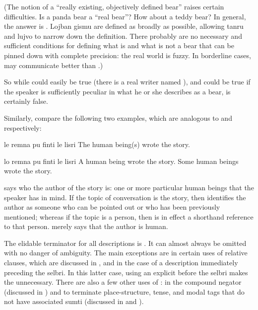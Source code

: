 (The notion of a ``really existing, objectively defined
    bear'' raises certain difficulties. Is a panda bear a ``real
    bear''? How about a teddy bear? In general, the answer is
    . Lojban gismu are defined as broadly as possible,
    allowing tanru and lujvo to narrow down the definition. There
    probably are no necessary and sufficient conditions for
    defining what is and what is not a bear that can be pinned down
    with complete precision: the real world is fuzzy. In borderline
    cases,  may communicate better than .)

So while  could easily be
    true (there is a real writer named ), and  could be true if the speaker is
    sufficiently peculiar in what he or she describes as a bear,  is certainly false.

Similarly, compare the following two examples, which are
    analogous to  and  respectively:
\begin{example}
le remna pu finti le lisri\n
The human being(s) wrote the story.
\end{example}

\begin{example}
lo remna pu finti le lisri\n
A human being wrote the story.\n
Some human beings wrote the story.
\end{example}

 says who the author of the
    story is: one or more particular human beings that the speaker
    has in mind. If the topic of conversation is the story, then  identifies the author as someone
    who can be pointed out or who has been previously mentioned;
    whereas if the topic is a person, then  is in
    effect a shorthand reference to that person.  merely says that the author is
    human. 

The elidable terminator for all descriptions is . It
    can almost always be omitted with no danger of ambiguity. The
    main exceptions are in certain uses of relative clauses, which
    are discussed in , and in the
    case of a description immediately preceding the selbri. In this
    latter case, using an explicit  before the selbri makes
    the  unnecessary. There are also a few other uses of
    : in the compound negator  (discussed in ) and to terminate
    place-structure, tense, and modal tags that do not have
    associated sumti (discussed in  and ).



